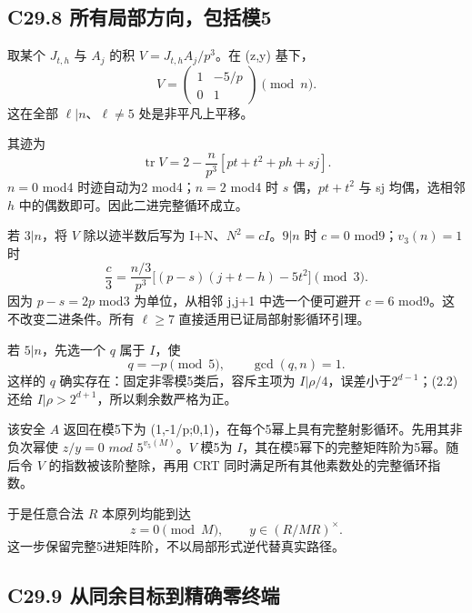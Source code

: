 \subsection*{\texorpdfstring{{C29.8} {所有局部方向，包括模5}}{C29.8 所有局部方向，包括模5}}\label{C29-h191}

{取某个} {\ensuremath{J_{t,h}}} {与} {\ensuremath{A_{j}}} {的积} {\ensuremath{V=J_{t,h}A_{j}/p^{3}}。在} {(z,y)} {基下，} \[
V=\begin{pmatrix}1&-5/p\\0&1\end{pmatrix}\pmod n.
\tag{C29.8.1}
\] {这在全部} {\ensuremath{\ell |n}、\ensuremath{\ell \ne 5}} {处是非平凡上平移。}

{其迹为} \[
\operatorname{tr}V=
2-\frac n{p^3}[pt+t^2+ph+sj].
\tag{C29.8.2}
\] {\ensuremath{n=0}} {mod4} {时迹自动为2} {mod4；\ensuremath{n=2}} {mod4} {时} {\ensuremath{s}} {偶，\ensuremath{pt+t^{2}}} {与} {sj} {均偶，选相邻} {\ensuremath{h}} {中的偶数即可。因此二进完整循环成立。}

{若} {\ensuremath{3|n}，将} {\ensuremath{V}} {除以迹半数后写为} {I+N、\ensuremath{N^{2}=cI}。\ensuremath{9|n}} {时} {\ensuremath{c=0}} {mod9；\ensuremath{v_{3}(n)=1}} {时} \[
\frac c3=
\frac{n/3}{p^3}
\bigl[(p-s)(j+t-h)-5t^2\bigr]\pmod3.
\tag{C29.8.3}
\] {因为} {\ensuremath{p-s=2p}} {mod3} {为单位，从相邻} {j,j+1} {中选一个便可避开} {\ensuremath{c=6}} {mod9。这不改变二进条件。所有} {\ensuremath{\ell \ge 7}} {直接适用已证局部射影循环引理。}

{若} {\ensuremath{5|n}，先选一个} {\ensuremath{q}} {属于} {\ensuremath{I}，使} \[
q=-p\pmod5,\qquad\gcd(q,n)=1.
\tag{C29.8.4}
\] {这样的} {\ensuremath{q}} {确实存在：固定非零模5类后，容斥主项为} {\textbar{}\ensuremath{I|\rho /4}，误差小于\ensuremath{2^{d-1}}；(2.2)} {还给} {\textbar{}\ensuremath{I|\rho >2^{d+1}}，所以剩余数严格为正。}

{该安全} {\ensuremath{A}} {返回在模5下为} {(1,-1/p;0,1)，在每个5幂上具有完整射影循环。先用其非负次幂使} {\ensuremath{z/y=0}} {\ensuremath{mod}} {\ensuremath{5^{v_{5}(M)}}。\ensuremath{V}} {模5为} {\ensuremath{I}，其在模5幂下的完整矩阵阶为5幂。随后令} {\ensuremath{V}} {的指数被该阶整除，再用} {CRT} {同时满足所有其他素数处的完整循环指数。}

{于是任意合法} {\ensuremath{R}} {本原列均能到达} \[
z=0\pmod M,\qquad y\in(R/MR)^\times.
\tag{C29.8.5}
\] {这一步保留完整5进矩阵阶，不以局部形式逆代替真实路径。}

\subsection*{\texorpdfstring{{C29.9} {从同余目标到精确零终端}}{C29.9 从同余目标到精确零终端}}\label{C29-h192}

